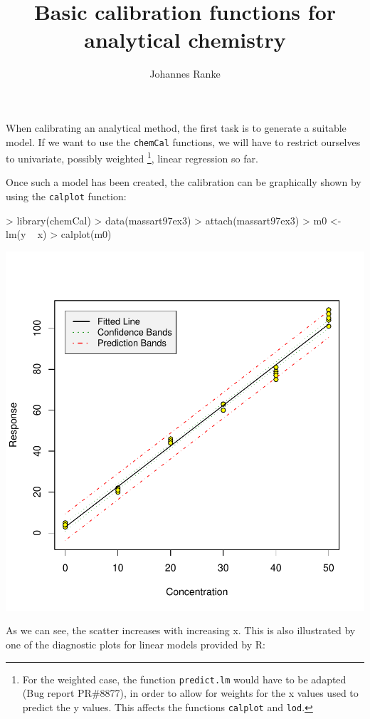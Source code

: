 \documentclass[a4paper]{article}
\title{Basic calibration functions for analytical chemistry}
\author{Johannes Ranke}
\begin{document}
\maketitle

When calibrating an analytical method, the first task is to generate
a suitable model. If we want to use the \texttt{chemCal} functions, we
will have to restrict ourselves to univariate, possibly weighted
\footnote{
For the weighted case, the function \texttt{predict.lm} would have to be 
adapted (Bug report PR\#8877), in order to allow for weights for the x values
used to predict the y values. This affects the functions \texttt{calplot}
and \texttt{lod}.
}, linear regression so far.

Once such a model has been created, the calibration can be graphically
shown by using the \texttt{calplot} function:

\begin{Schunk}
\begin{Sinput}
> library(chemCal)
> data(massart97ex3)
> attach(massart97ex3)
> m0 <- lm(y ~ x)
> calplot(m0)
\end{Sinput}
\end{Schunk}
\includegraphics{chemCal-001}

As we can see, the scatter increases with increasing x. This is also
illustrated by one of the diagnostic plots for linear models 
provided by R: 
\end{document}
